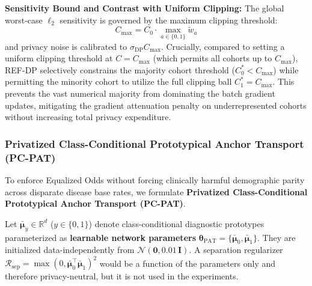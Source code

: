 \documentclass[pdflatex,sn-vancouver-num,referee,lineno]{sn-jnl}
\theoremstyle{thmstyleone}
\theoremstyle{thmstylethree}
\begin{document}
\noindent \textbf{Sensitivity Bound and Contrast with Uniform Clipping:} The global worst-case $\ell_2$ sensitivity is governed by the maximum clipping threshold:
\begin{equation}
    C_{\max} = C_0 \cdot \max_{a \in \{0, 1\}} \tilde{w}_a
\end{equation}
and privacy noise is calibrated to $\sigma_{\text{DP}} C_{\max}$. Crucially, compared to setting a uniform clipping threshold at $C = C_{\max}$ (which permits all cohorts up to $C_{\max}$), REF-DP selectively constrains the majority cohort threshold ($C_0^* < C_{\max}$) while permitting the minority cohort to utilize the full clipping ball $C_1^* = C_{\max}$. This prevents the vast numerical majority from dominating the batch gradient updates, mitigating the gradient attenuation penalty on underrepresented cohorts without increasing total privacy expenditure.

\subsubsection{Privatized Class-Conditional Prototypical Anchor Transport (PC-PAT)}
\label{sec:pc_pat}

To enforce Equalized Odds without forcing clinically harmful demographic parity across disparate disease base rates, we formulate \textbf{Privatized Class-Conditional Prototypical Anchor Transport (PC-PAT)}.

Let $\bar{\boldsymbol{\mu}}_y \in \mathbb{R}^d$ ($y \in \{0, 1\}$) denote class-conditional diagnostic prototypes parameterized as \textbf{learnable network parameters} $\boldsymbol{\theta}_{\text{PAT}} = \{\bar{\boldsymbol{\mu}}_0, \bar{\boldsymbol{\mu}}_1\}$. They are initialized data-independently from $\mathcal{N}(\mathbf{0}, 0.01\,\mathbf{I})$. A separation regularizer $\mathcal{R}_{\text{sep}} = \max(0, \bar{\boldsymbol{\mu}}_0^\top \bar{\boldsymbol{\mu}}_1)^2$ would be a function of the parameters only and therefore privacy-neutral, but it is not used in the experiments.
\end{document}
